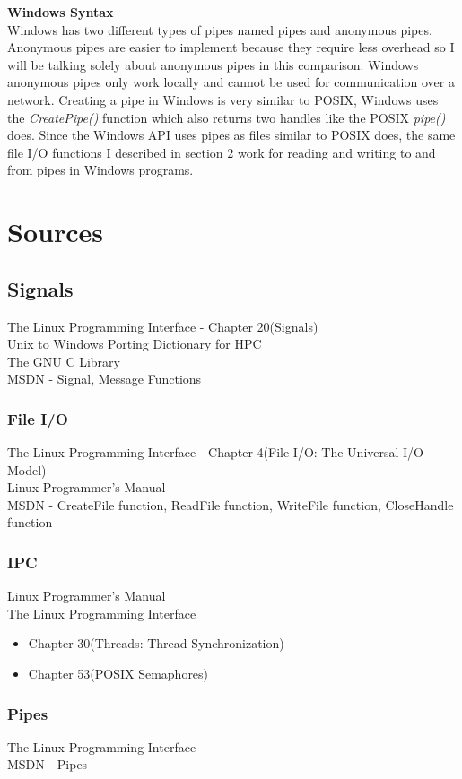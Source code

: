\documentclass[letterpaper,10pt,notitlepage,fleqn]{article}
\begin{document}
\textbf{Windows Syntax} \\
Windows has two different types of pipes named pipes and anonymous pipes. Anonymous pipes are easier to implement because they require less overhead so I will be talking solely about anonymous pipes in this comparison. Windows anonymous pipes only work locally and cannot be used for communication over a network. Creating a pipe in Windows is very similar to POSIX, Windows uses the \textit{CreatePipe()} function which also returns two handles like the POSIX \textit{pipe()} does. Since the Windows API uses pipes as files similar to POSIX does, the same file I/O functions I described in section 2 work for reading and writing to and from pipes in Windows programs.

\section*{Sources}
\subsection*{Signals}
The Linux Programming Interface - Chapter 20(Signals)\\
Unix to Windows Porting Dictionary for HPC \\
The GNU C Library \\
MSDN - Signal, Message Functions 

\subsubsection*{File I/O}
The Linux Programming Interface - Chapter 4(File I/O: The Universal I/O Model)\\
Linux Programmer's Manual \\
MSDN - CreateFile function, ReadFile function, WriteFile function, CloseHandle function

\subsubsection*{IPC}
Linux Programmer's Manual \\
The Linux Programming Interface
\begin{itemize}
\item Chapter 30(Threads: Thread Synchronization)
\item Chapter 53(POSIX Semaphores)
\end{itemize}

\subsubsection*{Pipes}
The Linux Programming Interface \\
MSDN - Pipes
\end{document}
